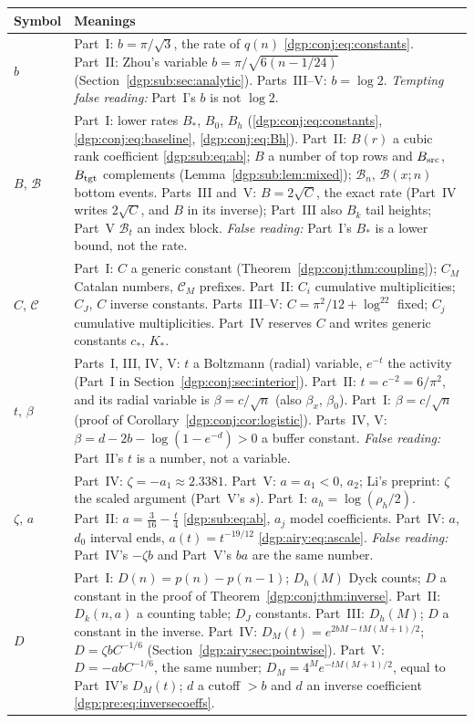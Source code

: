 \documentclass[11pt,letterpaper]{article}
\numberwithin{equation}{section}
\theoremstyle{remark}\newtheorem{remark}[theorem]{Remark}
\begin{document}
\begin{longtable}{@{}>{\raggedright\arraybackslash}p{} >{\raggedright\arraybackslash}p{}@{}}
\toprule
Symbol & Meanings\\
\midrule
\endhead
$b$ & Part~I: $b=\pi/\sqrt3$, the rate of $q(n)$ \eqref{dgp:conj:eq:constants}. Part~II: Zhou's variable $b=\pi/\sqrt{6(n-1/24)}$ (Section~\ref{dgp:sub:sec:analytic}). Parts~III--V: $b=\log2$. \emph{Tempting false reading:} Part~I's $b$ is not $\log2$.\\
$B$, $\mathcal B$ & Part~I: lower rates $B_*$, $B_0$, $B_h$ (\eqref{dgp:conj:eq:constants}, \eqref{dgp:conj:eq:baseline}, \eqref{dgp:conj:eq:Bh}). Part~II: $B(r)$ a cubic rank coefficient \eqref{dgp:sub:eq:ab}; $B$ a number of top rows and $B_{\rm src}$, $B_{\rm tgt}$ complements (Lemma~\ref{dgp:sub:lem:mixed}); $\mathcal B_n$, $\mathcal B(x;n)$ bottom events. Parts~III and~V: $B=2\sqrt C$, the exact rate (Part~IV writes $2\sqrt C$, and $B$ in its inverse); Part~III also $B_k$ tail heights; Part~V $\mathcal B_t$ an index block. \emph{False reading:} Part~I's $B_*$ is a lower bound, not the rate.\\
$C$, $\mathcal C$ & Part~I: $C$ a generic constant (Theorem~\ref{dgp:conj:thm:coupling}); $C_M$ Catalan numbers, $\mathcal C_M$ prefixes. Part~II: $C_i$ cumulative multiplicities; $C_J$, $C$ inverse constants. Parts~III--V: $C=\pi^2/12+\log^22$ fixed; $C_j$ cumulative multiplicities. Part~IV reserves $C$ and writes generic constants $c_*$, $K_*$.\\
$t$, $\beta$ & Parts~I, III, IV, V: $t$ a Boltzmann (radial) variable, $e^{-t}$ the activity (Part~I in Section~\ref{dgp:conj:sec:interior}). Part~II: $t=c^{-2}=6/\pi^2$, and its radial variable is $\beta=c/\sqrt n$ (also $\beta_x$, $\beta_0$). Part~I: $\beta=c/\sqrt n$ (proof of Corollary~\ref{dgp:conj:cor:logistic}). Parts~IV, V: $\beta=d-2b-\log(1-e^{-d})>0$ a buffer constant. \emph{False reading:} Part~II's $t$ is a number, not a variable.\\
$\zeta$, $a$ & Part~IV: $\zeta=-a_1\approx2.3381$. Part~V: $a=a_1<0$, $a_2$; Li's preprint: $\zeta$ the scaled argument (Part~V's $s$). Part~I: $a_h=\log(\rho_h/2)$. Part~II: $a=\frac3{16}-\frac t4$ \eqref{dgp:sub:eq:ab}, $a_j$ model coefficients. Part~IV: $a$, $d_0$ interval ends, $a(t)=t^{-19/12}$ \eqref{dgp:airy:eq:ascale}. \emph{False reading:} Part~IV's $-\zeta b$ and Part~V's $ba$ are the same number.\\
$D$ & Part~I: $D(n)=p(n)-p(n-1)$; $D_h(M)$ Dyck counts; $D$ a constant in the proof of Theorem~\ref{dgp:conj:thm:inverse}. Part~II: $D_k(n,a)$ a counting table; $D_J$ constants. Part~III: $D_h(M)$; $D$ a constant in the inverse. Part~IV: $D_M(t)=e^{2bM-tM(M+1)/2}$; $D=\zeta bC^{-1/6}$ (Section~\ref{dgp:airy:sec:pointwise}). Part~V: $D=-abC^{-1/6}$, the same number; $D_M=4^Me^{-tM(M+1)/2}$, equal to Part~IV's $D_M(t)$; $d$ a cutoff $>b$ and $d$ an inverse coefficient \eqref{dgp:pre:eq:inversecoeffs}.\\

\end{longtable}
\end{document}
